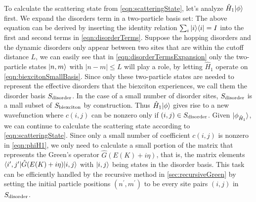 To calculate the scattering state from \autoref{eqn:scatteringState}, let's analyze $\hat{H}_1 | \phi  \rangle$ first. 
We expand the disorders term in a two-particle basis set:
The above equation can be derived by inserting the identity relation $\sum_{i} | i \rangle\langle i | = I$ into the first and 
second terms in \autoref{eqn:disorderTerms}. Suppose the hopping disorders and the dynamic disorders only appear
between two sites that are within the cutoff distance $L$, we can easily see that in 
\autoref{eqn:disorderTermsExpansion} only  the two-particle states $| n, m \rangle$ with $|n-m|\leq L$ will play a role, by letting $\hat{H}_1$ operate on 
\autoref{eqn:biexcitonSmallBasis}. Since only these two-particle states are needed to represent the effective
 disorders that the biexciton experiences, we call them the disorder basis $S_{\rm disorder}$. In the case of a small 
number of disorder sites, $S_{\rm disorder}$ is a mall subset of $S_{\rm biexciton}$ by construction. Thus 
$\hat{H}_1 | \phi  \rangle$ gives rise to a new wavefunction 
where $ c(i, j)$ can be nonzero only if  $(i, j) \in S_{\rm disorder} $. Given
 $| \phi_{\hat{H}_1} \rangle$, we can continue to calculate the scattering state according to 
\autoref{eqn:scatteringState}. Since only a small number of coefficient $c(i, j)$ is nonzero in \autoref{eqn:phiH1}, 
we only need to calculate a small portion of the matrix that represents the Green's operator 
$\hat{G}(E(K) + i\eta)$, that is, the matrix elements $\langle i^{\prime}, j^{\prime} |\hat{G}(E(K) + i\eta) | i, j \rangle$ 
with $| i, j \rangle$ being states in the disorder basis. This task can be efficiently handled by the recursive method in
\autoref{sec:recursiveGreen} by setting the initial particle positions $(n^{\prime}, m^{\prime})$ to be every site 
pairs $(i, j)$ in $S_{\rm disorder}$. 

